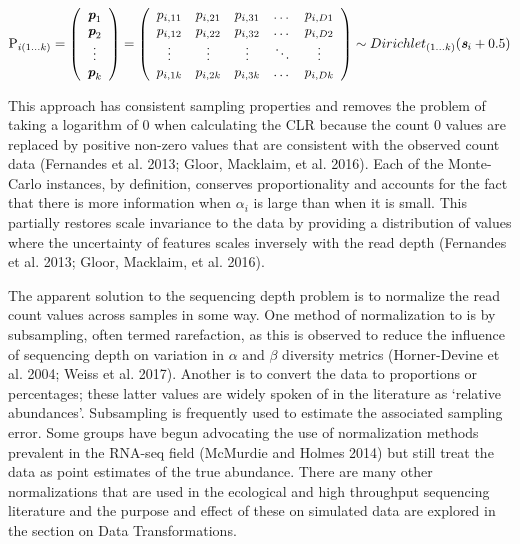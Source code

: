 \documentclass[onecolumn]{article}
\begin{document}
\parbox[b]{7in}{
\begin{equation}
\textrm{P}_{i (1 \ldots k)}=
\left( \begin{array}{c}
    \textit{\textbf{p}}_1 \\
   \textit{\textbf{p}}_2 \\
    \vdots \\
    \textit{\textbf{p}}_k \\
\end{array} \right)=
\left( \begin{array}{ccccc}
    p_{i,11} & p_{i,21} & p_{i,31} & \dots  & p_{i,D1} \\
    p_{i,12} & p_{i,22} & p_{i,32} & \dots  & p_{i,D2} \\
    \vdots & \vdots & \vdots & \ddots & \vdots \\
    p_{i,1k} & p_{i,2k} & p_{i,3k} & \dots  & p_{i,Dk}\\
\end{array} \right)
\sim Dirichlet_{(1 \ldots k)}(\textit{\textbf{s}}_i + 0.5)
\label{eq:matrix}
\end{equation}
}

This approach has consistent sampling properties and removes the problem of taking a logarithm of 0 when calculating the CLR because the count 0 values are replaced by positive non-zero values that are consistent with the observed count data (Fernandes et al. 2013; Gloor, Macklaim, et al. 2016). Each of the Monte-Carlo instances, by definition, conserves proportionality and accounts for the fact that there is more information when \(\alpha_i\) is large than when it is small. This partially restores scale invariance to the data by providing a distribution of values where the uncertainty of features scales inversely with the read depth (Fernandes et al. 2013; Gloor, Macklaim, et al. 2016).

The apparent solution to the sequencing depth problem is to normalize the read count values across samples in some way. One method of normalization to is by subsampling, often termed rarefaction, as this is observed to reduce the influence of sequencing depth on variation in \(\alpha\) and \(\beta\) diversity metrics (Horner-Devine et al. 2004; Weiss et al. 2017). Another is to convert the data to proportions or percentages; these latter values are widely spoken of in the literature as `relative abundances'. Subsampling is frequently used to estimate the associated sampling error. Some groups have begun advocating the use of normalization methods prevalent in the RNA-seq field (McMurdie and Holmes 2014) but still treat the data as point estimates of the true abundance. There are many other normalizations that are used in the ecological and high throughput sequencing literature and the purpose and effect of these on simulated data are explored in the section on Data Transformations.
\end{document}

